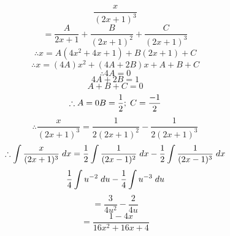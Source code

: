 \documentclass{article}
\begin{document}
  $$ \frac{x}{(2x+1)^3}$$
  $$=\frac{A}{2x+1}+\frac{B}{(2x+1)^2}+\frac{C}{(2x+1)^3}$$
   $$\therefore x=A(4x^2+4x+1)+B(2x+1)+C$$
  $$\therefore x=(4A)x^2+(4A+2B)x+A+B+C$$
  $$\therefore 4A=0$$
   $$4A+2B=1$$
   $$A+B+C=0$$
  $$\therefore A=0 B=\frac{1}{2};\hspace{1mm} C=\frac{-1}{2}$$
  $$\therefore\frac{x}{(2x+1)^3}=\frac{1}{2(2x+1)^2}-\frac{1}{2(2x+1)^3}$$
  $$\therefore \int \frac{x}{(2x+1)^3} \hspace{1mm} dx= \frac{1}{2}\int\frac{1}{(2x-1)^2}\hspace{1mm}dx-\frac{1}{2}\int\frac{1}{(2x-1)^3}\hspace{1mm}dx$$
  $$\frac{1}{4}\int u^{-2}\hspace{1mm}du-\frac{1}{4}\int u^{-3}\hspace{1mm}du$$
  $$=\frac{3}{4u^2}-\frac{2}{4u}$$
  $$=\frac{1-4x}{16x^2+16x+4}$$
  
\end{document}
